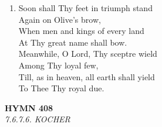 \documentclass[11pt,a4paper]{article}
\begin{document}
\begin{enumerate}
    \item Soon shall Thy feet in triumph stand \\
        Again on Olive's brow, \\
        When men and kings of every land \\
        At Thy great name shall bow. \\
        Meanwhile, O Lord, Thy sceptre wield \\
        Among Thy loyal few, \\
        Till, as in heaven, all earth shall yield \\
        To Thee Thy royal due.

\end{enumerate}

\newpage
\begin{center}
    {\Large \textbf{HYMN 408}}
    \\
    \textit{7.6.7.6. KOCHER}
\end{center}
\vspace{1em}
\end{document}
